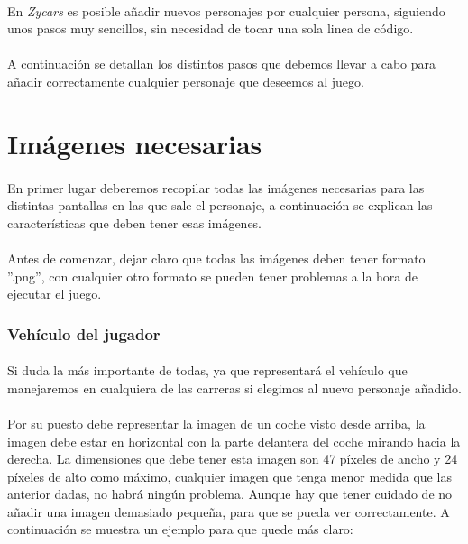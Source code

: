 \paragraph{}
En \emph{Zycars} es posible añadir nuevos personajes por cualquier persona,
siguiendo unos pasos muy sencillos,
sin necesidad de tocar una sola linea de código.

\paragraph{}
A continuación se detallan los distintos pasos que debemos llevar a cabo para añadir correctamente cualquier personaje que deseemos
al juego.

\section{Imágenes necesarias}

\paragraph{}
En primer lugar deberemos recopilar todas las imágenes necesarias para las
distintas pantallas en las que sale el personaje, a 
continuación se explican las características que deben tener esas imágenes.

\paragraph{}
Antes de comenzar, dejar claro que todas las imágenes deben tener formato ''.png'', con cualquier otro formato se pueden tener 
problemas a la hora de ejecutar el juego.

\subsubsection{Vehículo del jugador}

\paragraph{}
Si duda la más importante de todas, ya que representará el vehículo que manejaremos en cualquiera de las carreras si elegimos al 
nuevo personaje añadido.

\paragraph{}
Por su puesto debe representar la imagen de un coche visto desde arriba, la imagen debe estar en horizontal con la parte delantera
del coche mirando hacia la derecha. La dimensiones que debe tener esta imagen son 47 píxeles de ancho y 24 píxeles de alto como 
máximo, cualquier imagen que tenga menor medida que las anterior dadas, no habrá ningún problema. Aunque hay que tener cuidado de no
añadir una imagen demasiado pequeña, para que se pueda ver correctamente. A continuación se muestra un ejemplo para que quede más 
claro:

